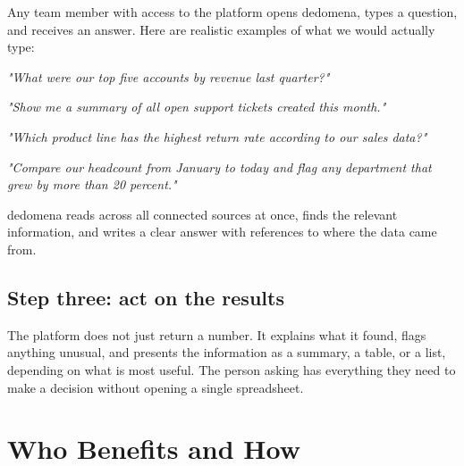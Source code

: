 \documentclass[12pt, a4paper]{article}
\begin{document}
Any team member with access to the platform opens dedomena, types a question,
and receives an answer. Here are realistic examples of what we would actually type:

\begin{highlight}
  \textit{"What were our top five accounts by revenue last quarter?"}

  \vspace{0.4em}
  \textit{"Show me a summary of all open support tickets created this month."}

  \vspace{0.4em}
  \textit{"Which product line has the highest return rate according to our sales data?"}

  \vspace{0.4em}
  \textit{"Compare our headcount from January to today and flag any department that
           grew by more than 20 percent."}
\end{highlight}

dedomena reads across all connected sources at once, finds the relevant information,
and writes a clear answer with references to where the data came from.

\subsection{Step three: act on the results}

The platform does not just return a number. It explains what it found, flags
anything unusual, and presents the information as a summary, a table, or a list,
depending on what is most useful. The person asking has everything they need to
make a decision without opening a single spreadsheet.


\section{Who Benefits and How}
\end{document}
